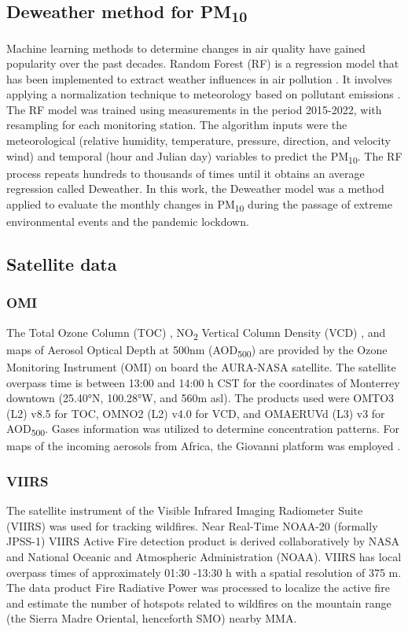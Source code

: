 \documentclass[sn-mathphys-num,iicol]{sn-jnl}
\begin{document}
\subsection{Deweather method for PM\textsubscript{10}}
Machine learning methods to determine changes in air quality have gained popularity over the past decades. Random Forest (RF) is a regression model that has been implemented to extract weather influences in air pollution \citep{Breiman_2001,Vu_2019,Cole_2020}. It involves applying a normalization technique to meteorology based on pollutant emissions \citep{Stuart_2019,Zongbo_2021,Lv_2022}. The RF model was trained using measurements in the period 2015-2022, with resampling for each monitoring station. The algorithm inputs were the meteorological (relative humidity, temperature, pressure, direction, and velocity wind) and temporal (hour and Julian day) variables to predict the PM\textsubscript{10}. The RF process repeats hundreds to thousands of times until it obtains an average regression called Deweather. In this work, the Deweather model was a method applied to evaluate the monthly changes in PM\textsubscript{10} during the passage of extreme environmental events and the pandemic lockdown.
\subsection{Satellite data}
\subsubsection{OMI}
The Total Ozone Column (TOC) \citep{dcio}, NO\textsubscript{2} Vertical Column Density (VCD) \citep{Lamsal_2020}, and maps of Aerosol Optical Depth at 500nm (AOD\textsubscript{500}) are provided by the Ozone Monitoring Instrument (OMI) on board the AURA-NASA satellite. The satellite overpass time is between 13:00 and 14:00 h CST for the coordinates of Monterrey downtown (25.40°N, 100.28°W, and 560m asl). The products used were OMTO3 (L2) v8.5 for TOC, OMNO2 (L2) v4.0 for VCD, and OMAERUVd (L3) v3 for AOD\textsubscript{500}. Gases information was utilized to determine concentration patterns. For maps of the incoming aerosols from Africa, the Giovanni platform was employed \citep{torres2008}.
\subsubsection{VIIRS}
The satellite instrument of the Visible Infrared Imaging Radiometer Suite (VIIRS) \citep{Schroeder_2014} was used for tracking wildfires. Near Real-Time NOAA-20 (formally JPSS-1) VIIRS Active Fire detection product is derived collaboratively by NASA and National Oceanic and Atmospheric Administration (NOAA). VIIRS has local overpass times of approximately 01:30 -13:30 h with a spatial resolution of 375 m. The data product Fire Radiative Power \citep{earthdata} was processed to localize the active fire and estimate the number of hotspots related to wildfires on the mountain range (the Sierra Madre Oriental, henceforth SMO) nearby MMA.
\end{document}
